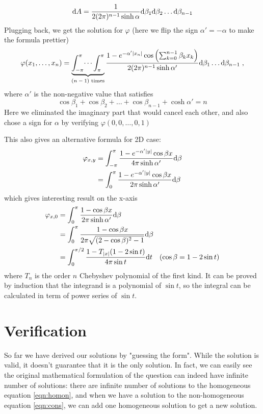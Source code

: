 \documentclass[10pt,a4paper,draft]{article}
\begin{document}
	 \[
	 \mathrm{d} A = \frac{1}{2(2\pi)^{n-1}\sinh\alpha}\mathrm{d}\beta_1\mathrm{d}\beta_2\dots\mathrm{d}\beta_{n-1}
	 \]
	 Plugging back, we get the solution for $\varphi$ (here we flip the sign $\alpha' = -\alpha$ to make the formula prettier)
	 \[
	 \varphi(x_1,\dots,x_n) = \underbrace{\int_{-\pi}^{\pi}\dots\int_{\pi}^{\pi}}_{\text{$(n-1)$ times}}\frac{1 - e^{-\alpha' |x_n|}\cos\left(\sum_{k=0}^{n-1}\beta_k x_k\right)}{2(2\pi)^{n-1}\sinh\alpha'}\mathrm{d}\beta_1\dots\mathrm{d}\beta_{n-1}\;,
	 \]
	 where $\alpha'$ is the non-negative value that satisfies
	 \[
	 \cos\beta_1+\cos\beta_2+\dots+\cos\beta_{n-1}+\cosh\alpha' = n
	 \]
	 Here we eliminated the imaginary part that would cancel each other, and also chose a sign for $\alpha$ by verifying $\varphi(0,0,\dots,0,1)$
	 
	 This also gives an alternative formula for 2D case:
	 \begin{align}
	 \varphi_{x,y} &= \int_{-\pi}^{\pi}\frac{1 - e^{-\alpha' |y|}\cos\beta x}{4\pi\sinh\alpha'}\mathrm{d}\beta \nonumber\\
	 &= \int_{0}^{\pi}\frac{1 - e^{-\alpha' |y|}\cos\beta x}{2\pi\sinh\alpha'}\mathrm{d}\beta \label{eq:2d}
	 \end{align}
	 which gives interesting result on the x-axis
	 \begin{align*}
	 \varphi_{x,0} &= \int_{0}^{\pi}\frac{1 - \cos\beta x}{2\pi\sinh\alpha'}\mathrm{d}\beta\\
	 &=\int_{0}^{\pi}\frac{1 - \cos\beta x}{2\pi\sqrt{(2-\cos\beta)^2 - 1}}\mathrm{d}\beta\\
	 &=\int_{0}^{\pi/2}\frac{1 - T_{|x|}(1-2\sin t)}{4\pi\sin t}\mathrm{d} t\quad (\cos\beta=1-2\sin t)
	 \end{align*}
	 where $T_n$ is the order $n$ Chebyshev polynomial of the first kind. It can be proved by induction that the integrand is a polynomial of $\sin t$, so the integral can be calculated in term of power series of $\sin t$.
	 
\section{Verification}

	So far we have derived our solutions by "guessing the form". While the solution is valid, it doesn't guarantee that it is the only solution. In fact, we can easily see the original mathematical formulation of the question can indeed have infinite number of solutions: there are infinite number of solutions to the homogeneous equation \eqref{eqn:homon}, and when we have a solution to the non-homogeneous equation \eqref{eqn:cons}, we can add one homogeneous solution to get a new solution.
	
\end{document}
